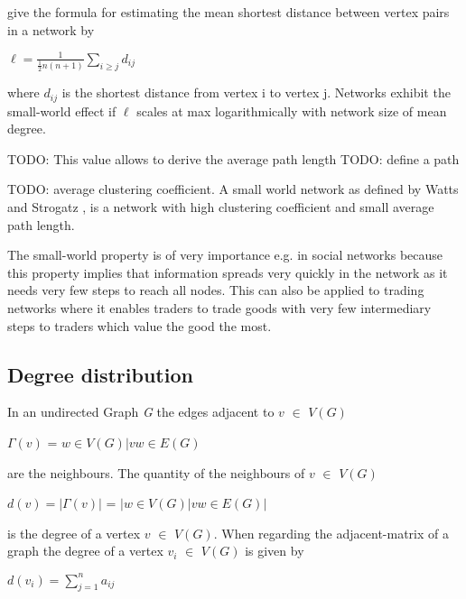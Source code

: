 \documentclass[../Bachelorarbeit.tex]{subfiles}
\begin{document}
\medskip

\cite{Newman_ComplexNetworks} give the formula for estimating the mean shortest distance between vertex pairs in a network by

\begin{center}
$\ell = \frac{1}{\frac{1}{2}n(n+1)} \displaystyle\sum_{i \geq j }^{} d_{ij}$
\end{center}

where $d_{ij}$ is the shortest distance from vertex i to vertex j. Networks exhibit the small-world effect if $\ell$ scales at max logarithmically with network size of mean degree.

\medskip

TODO: This value allows to derive the average path length 
TODO: define a path

\medskip

TODO: average clustering coefficient. A small world network as defined by Watts and Strogatz \cite{WattsStrogatz_DynamicsSmallWorld}, is a network with high clustering coefficient and small average path length. 

\medskip

The small-world property is of very importance e.g. in social networks because this property implies that information spreads very quickly in the network as it needs very few steps to reach all nodes. This can also be applied to trading networks where it enables traders to trade goods with very few intermediary steps to traders which value the good the most.

\subsection{Degree distribution}
In an undirected Graph \textit{G} the edges adjacent to $v$ $\in$ $V(G)$ 

\begin{center}
$\Gamma(v)$ = ${w \in V(G) | vw \in E(G)}$
\end{center}

are the neighbours. The quantity of the neighbours of $v$ $\in$ $V(G)$ 

\begin{center}
$d(v) = |\Gamma(v)|$ = $|{w \in V(G) | vw \in E(G)}|$
\end{center}

is the degree of a vertex $v$ $\in$ $V(G)$. When regarding the adjacent-matrix of a graph the degree of a vertex $v_i$ $\in$ $V(G)$ is given by

\begin{center}
$d(v_i) = \displaystyle\sum_{j=1}^{n} a_{ij}$
\end{center}
\end{document}

